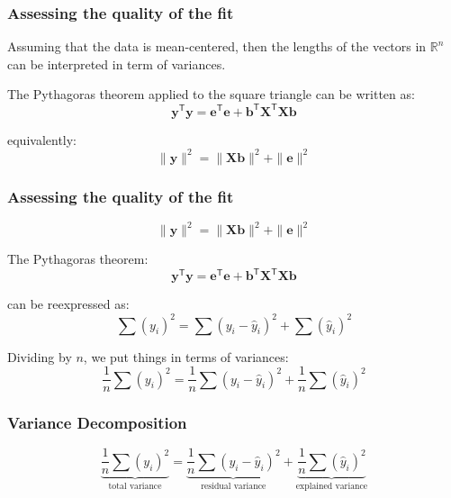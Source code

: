 \documentclass[12pt]{beamer}\usepackage[]{graphicx}\usepackage[]{color}
\begin{document}
\begin{frame}
\frametitle{Assessing the quality of the fit}
\begin{center}
\end{center}
\end{frame}


\begin{frame}

Assuming that the data is mean-centered, then the lengths of the vectors in 
$\mathbb{R}^n$ can be interpreted in term of variances.

\bigskip
The Pythagoras theorem applied to the square triangle can be written as:
$$
\mathbf{y^{\mathsf{T}} y = e^{\mathsf{T}} e + b^{\mathsf{T}} X^{\mathsf{T}} X b}
$$

\bigskip
equivalently:
$$
\| \mathbf{y} \|^2 = \| \mathbf{Xb} \|^2 + \| \mathbf{e} \|^2
$$

\end{frame}


\begin{frame}
\frametitle{Assessing the quality of the fit}
\begin{center}
\end{center}

$$
\| \mathbf{y} \|^2 = \| \mathbf{Xb} \|^2 + \| \mathbf{e} \|^2
$$

\end{frame}


\begin{frame}

The Pythagoras theorem:
$$
\mathbf{y^{\mathsf{T}} y = e^{\mathsf{T}} e + b^{\mathsf{T}} X^{\mathsf{T}} X b}
$$

can be reexpressed as:
$$
\sum (y_i)^2 = \sum (y_i - \hat{y}_i)^2 + \sum (\hat{y}_i)^2
$$


Dividing by $n$, we put things in terms of variances:
$$
\frac{1}{n} \sum (y_i)^2 = \frac{1}{n} \sum (y_i - \hat{y}_i)^2 + \frac{1}{n} \sum (\hat{y}_i)^2
$$

\end{frame}


\begin{frame}
\frametitle{Variance Decomposition}

{\large
$$
\underbrace{ \frac{1}{n} \sum (y_i)^2}_{\text{total variance}} = 
\underbrace{ \frac{1}{n} \sum (y_i - \hat{y}_i)^2}_{\text{residual variance}} + 
\underbrace{ \frac{1}{n} \sum (\hat{y}_i)^2}_{\text{explained variance}}
$$
}

\end{frame}
\end{document}

